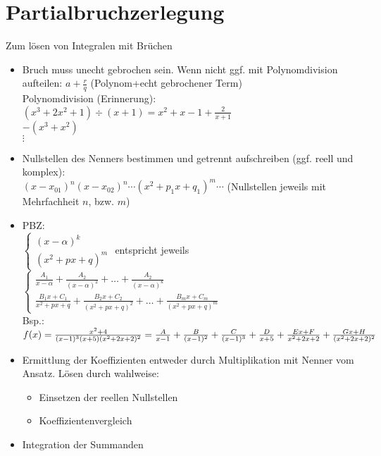 \section{Partialbruchzerlegung}
Zum lösen von Integralen mit Brüchen
\begin{itemize}
\item Bruch muss unecht gebrochen sein. Wenn nicht ggf. mit Polynomdivision aufteilen: $a+\frac{r}{q}$ (Polynom+echt gebrochener Term)\\
Polynomdivision (Erinnerung):\\
$(x^3+2x^2+1)\div (x+1)=x^2+x-1+\frac{2}{x+1}$\\
$-(x^3+x^2)$\\
$\vdots$
\item Nullstellen des Nenners bestimmen und getrennt aufschreiben (ggf. reell und komplex): \\
$(x-x_{01})^n(x-x_{02})^n\cdots (x^2+p_1x+q_1)^m \cdots$ (Nullstellen jeweils mit Mehrfachheit $n$, bzw. $m$)
\item PBZ:\\
$\begin{cases}
(x-\alpha)^k\\
(x^2+px+q)^m
\end{cases}$ entspricht jeweils
$\begin{cases}
\frac{A_1}{x-\alpha}+\frac{A_2}{(x-\alpha)^2}+\dots + \frac{A_2}{(x-\alpha)^k}\\
\frac{B_1x+C_1}{x^2+px+q}+\frac{B_2 x + C_2}{(x^2+px+q)^2}+\dots + \frac{B_m x + C_m}{(x^2+px+q)^m}
\end{cases}$\\
Bsp.: $f(x) = \frac{x^2+4}{(x-1)^3(x+5)(x^2+2x+2)^2}\\
=\frac{A}{x-1}+\frac{B}{(x-1)^2}+\frac{C}{(x-1)^3}+ \frac{D}{x+5}+ \frac{Ex+F}{x^2+2x+2}+\frac{Gx+H}{(x^2+2x+2)^2}$
\item Ermittlung der Koeffizienten entweder durch Multiplikation mit Nenner vom Ansatz. Lösen durch wahlweise:
\begin{itemize}
\item Einsetzen der reellen Nullstellen
\item Koeffizientenvergleich
\end{itemize}
\item Integration der Summanden
\end{itemize}
